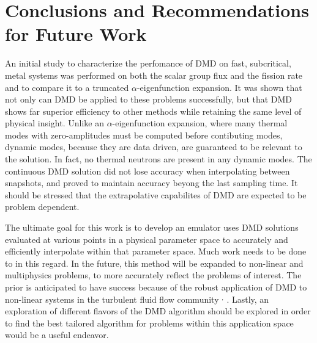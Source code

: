 \documentclass[12pt]{article}
\begin{document}
\section{Conclusions and Recommendations for Future Work}
An initial study to characterize the perfomance of DMD on fast, subcritical, 
	metal systems was performed on both the scalar group flux and the fission 
	rate and to compare it to a truncated $\alpha$-eigenfunction expansion.
It was shown that not only can DMD be applied to these problems successfully,
	but that DMD shows far superior efficiency to other methods while retaining 
	the same level of physical insight.
Unlike an $\alpha$-eigenfunction expansion, where many thermal modes with 
	zero-amplitudes must be computed before contibuting modes, dynamic modes, 
	because they are data driven, are guaranteed to be relevant to the solution.
In fact, no thermal neutrons are present in any dynamic modes.
The continuous DMD solution did not lose accuracy when interpolating between 
	snapshots, and proved to maintain accuracy beyong the last sampling time.
It should be stressed that the extrapolative capabilites of DMD are expected to 
	be problem dependent.

The ultimate goal for this work is to develop an emulator uses DMD solutions
	evaluated at various points in a physical parameter space to accurately and 
	efficiently interpolate within that parameter space.
Much work needs to be done to in this regard.
In the future, this method will be expanded to non-linear and multiphysics problems, to more 
	accurately reflect the problems of interest.
The prior is anticipated to have success because of the robust application of DMD to non-linear 
	systems in the turbulent fluid flow community \cite{dmd2016}$^,$\cite{schmid2010} .
Lastly, an exploration of different flavors of the DMD algorithm should be 
	explored in order to find the best tailored algorithm for problems within 
	this application space would be a useful endeavor.


\setlength{\baselineskip}{12pt}


\end{document}
